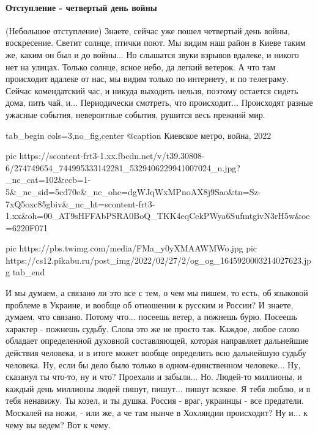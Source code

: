  
 
 
 
 

\paragraph{Отступление - четвертый день войны}

(Небольшое отступление) Знаете, сейчас уже пошел четвертый день войны,
воскресение. Светит солнце, птички поют. Мы видим наш район в Киеве таким же,
каким он был и до войны...  Но слышатся звуки взрывов вдалеке, и никого нет на
улицах. Только солнце, ясное небо, да легкий ветерок.  А что там происходит
вдалеке от нас, мы видим только по интернету, и по телеграму.  Сейчас
комендатский час, и никуда выходить нельзя, поэтому остается сидеть дома, пить
чай, и...  Периодически смотреть, что происходит...  Происходят разные ужасные
события, невероятные события, рушится весь прежний мир. 

\ifcmt
  tab_begin cols=3,no_fig,center
		 @caption Киевское метро, война, 2022

     pic https://scontent-frt3-1.xx.fbcdn.net/v/t39.30808-6/274749654_744995333142281_5329406229941007024_n.jpg?_nc_cat=102&ccb=1-5&_nc_sid=5cd70e&_nc_ohc=dgWJqWxMPnoAX8j9Sao&tn=Sz-7xQ5oxc85gbiv&_nc_ht=scontent-frt3-1.xx&oh=00_AT9sHFFAbPSRA0BoQ_TKK4eqCekPWya6SufmtgivN3rH5w&oe=6220F071

		 pic https://pbs.twimg.com/media/FMa_y0yXMAAWMWo.jpg
		 pic https://cs12.pikabu.ru/post_img/2022/02/27/2/og_og_1645920003214027623.jpg
  tab_end
\fi

И мы думаем, а связано ли это все с тем, о чем мы
пишем, то есть, об языковой проблеме в Украине, и вообще об отношении к русским
и России? И знаете, думаем, что связано. Потому что...  посеешь ветер, а
пожнешь бурю. Посеешь характер - пожнешь судьбу. Слова это же не просто так.
Каждое, любое слово обладает определенной духовной составляющей, которая
направляет дальнейшие действия человека, и в итоге может вообще определить всю
дальнейшую судьбу человека. Ну, если бы дело было только в одном-единственном
человеке... Ну, сказанул ты что-то, ну и что? Проехали и забыли... Но. Людей-то
миллионы, и каждый день миллионы людей пишут, пишут...  пишут всякое. Я тебя
люблю, и я тебя ненавижу.  Ты козел, и ты душка. Россия - враг, украинцы - все
предатели. Москалей на ножи, - или же, а че там нынче в Хохляндии происходит?
Ну и... к чему вы ведем? Вот к чему. 

